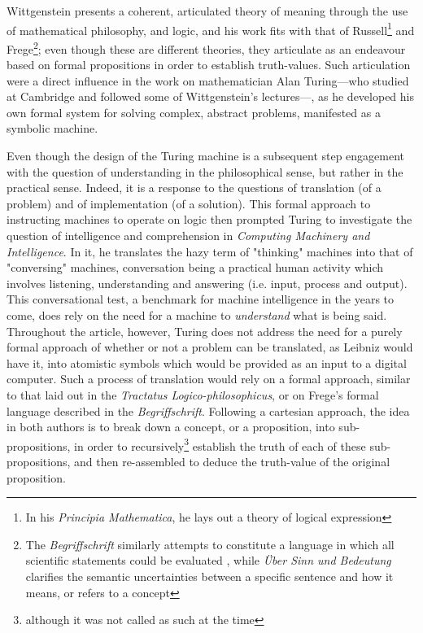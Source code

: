 Wittgenstein presents a coherent, articulated theory of meaning through the use of mathematical philosophy, and logic, and his work fits with that of Russell\footnote{In his \emph{Principia Mathematica}, he lays out a theory of logical expression} and Frege\footnote{The \emph{Begriffschrift} similarly attempts to constitute a language in which all scientific statements could be evaluated \cite{korte_frege_2010}, while \emph{Über Sinn und Bedeutung} clarifies the semantic uncertainties between a specific sentence and how it means, or refers to a concept}; even though these are different theories, they articulate as an endeavour based on formal propositions in order to establish truth-values. Such articulation were a direct influence in the work on mathematician Alan Turing—who studied at Cambridge and followed some of Wittgenstein's lectures—, as he developed his own formal system for solving complex, abstract problems, manifested as a symbolic machine\cite{turing_computable_1936}.

Even though the design of the Turing machine is a subsequent step engagement with the question of understanding in the philosophical sense, but rather in the practical sense. Indeed, it is a response to the questions of translation (of a problem) and of implementation (of a solution). This formal approach to instructing machines to operate on logic then prompted Turing to investigate the question of intelligence and comprehension in \emph{Computing Machinery and Intelligence}\cite{turing_computing_2009}. In it, he translates the hazy term of "thinking" machines into that of "conversing" machines, conversation being a practical human activity which involves listening, understanding and answering (i.e. input, process and output). This conversational test, a benchmark for machine intelligence in the years to come, does rely on the need for a machine to \emph{understand} what is being said. Throughout the article, however, Turing does not address the need for a purely formal approach of whether or not a problem can be translated, as Leibniz would have it, into atomistic symbols which would be provided as an input to a digital computer. Such a process of translation would rely on a formal approach, similar to that laid out in the \emph{Tractatus Logico-philosophicus}, or on Frege's formal language described in the \emph{Begriffschrift}. Following a cartesian approach, the idea in both authors is to break down a concept, or a proposition, into sub-propositions, in order to recursively\footnote{although it was not called as such at the time} establish the truth of each of these sub-propositions, and then re-assembled to deduce the truth-value of the original proposition.

